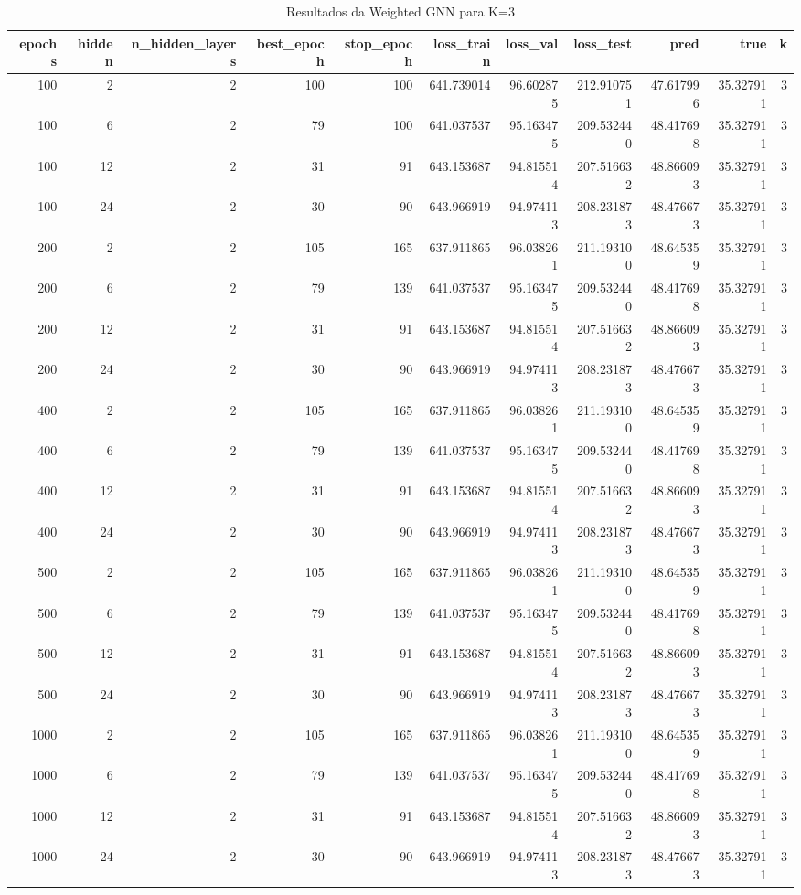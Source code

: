 \begin{table}
\caption{Resultados da Weighted GNN para K=3}
\label{tab:weighted_gnn_results_k3}
\begin{tabular}{rrrrrrrrrrr}
\toprule
epochs & hidden & n\_hidden\_layers & best\_epoch & stop\_epoch & loss\_train & loss\_val & loss\_test & pred & true & k \\
\midrule
100 & 2 & 2 & 100 & 100 & 641.739014 & 96.602875 & 212.910751 & 47.617996 & 35.327911 & 3 \\
100 & 6 & 2 & 79 & 100 & 641.037537 & 95.163475 & 209.532440 & 48.417698 & 35.327911 & 3 \\
100 & 12 & 2 & 31 & 91 & 643.153687 & 94.815514 & 207.516632 & 48.866093 & 35.327911 & 3 \\
100 & 24 & 2 & 30 & 90 & 643.966919 & 94.974113 & 208.231873 & 48.476673 & 35.327911 & 3 \\
200 & 2 & 2 & 105 & 165 & 637.911865 & 96.038261 & 211.193100 & 48.645359 & 35.327911 & 3 \\
200 & 6 & 2 & 79 & 139 & 641.037537 & 95.163475 & 209.532440 & 48.417698 & 35.327911 & 3 \\
200 & 12 & 2 & 31 & 91 & 643.153687 & 94.815514 & 207.516632 & 48.866093 & 35.327911 & 3 \\
200 & 24 & 2 & 30 & 90 & 643.966919 & 94.974113 & 208.231873 & 48.476673 & 35.327911 & 3 \\
400 & 2 & 2 & 105 & 165 & 637.911865 & 96.038261 & 211.193100 & 48.645359 & 35.327911 & 3 \\
400 & 6 & 2 & 79 & 139 & 641.037537 & 95.163475 & 209.532440 & 48.417698 & 35.327911 & 3 \\
400 & 12 & 2 & 31 & 91 & 643.153687 & 94.815514 & 207.516632 & 48.866093 & 35.327911 & 3 \\
400 & 24 & 2 & 30 & 90 & 643.966919 & 94.974113 & 208.231873 & 48.476673 & 35.327911 & 3 \\
500 & 2 & 2 & 105 & 165 & 637.911865 & 96.038261 & 211.193100 & 48.645359 & 35.327911 & 3 \\
500 & 6 & 2 & 79 & 139 & 641.037537 & 95.163475 & 209.532440 & 48.417698 & 35.327911 & 3 \\
500 & 12 & 2 & 31 & 91 & 643.153687 & 94.815514 & 207.516632 & 48.866093 & 35.327911 & 3 \\
500 & 24 & 2 & 30 & 90 & 643.966919 & 94.974113 & 208.231873 & 48.476673 & 35.327911 & 3 \\
1000 & 2 & 2 & 105 & 165 & 637.911865 & 96.038261 & 211.193100 & 48.645359 & 35.327911 & 3 \\
1000 & 6 & 2 & 79 & 139 & 641.037537 & 95.163475 & 209.532440 & 48.417698 & 35.327911 & 3 \\
1000 & 12 & 2 & 31 & 91 & 643.153687 & 94.815514 & 207.516632 & 48.866093 & 35.327911 & 3 \\
1000 & 24 & 2 & 30 & 90 & 643.966919 & 94.974113 & 208.231873 & 48.476673 & 35.327911 & 3 \\
\bottomrule
\end{tabular}
\end{table}
